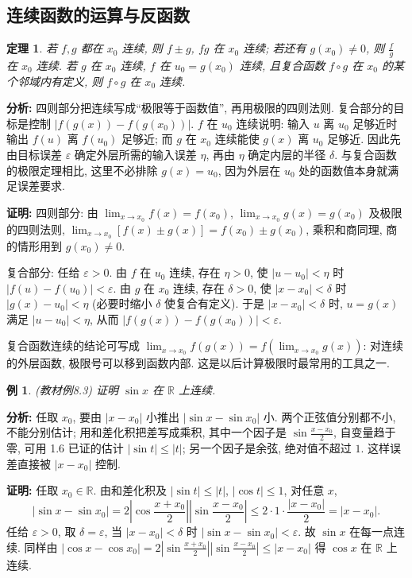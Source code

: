 \documentclass[UTF8,openany]{ctexbook}
\theoremstyle{chinesetextbook}
\newtheorem{example}{例}[section]
\newtheorem{theorem}{定理}[section]
\newenvironment{cnproof}{\par\indent\textbf{证明:} \ignorespaces}{\par}
\begin{document}
\subsection{连续函数的运算与反函数}
\begin{theorem}
若 $f,g$ 都在 $x_0$ 连续, 则 $f\pm g$, $fg$ 在 $x_0$ 连续; 若还有 $g(x_0)\ne0$, 则 $\displaystyle\frac fg$ 在 $x_0$ 连续. 若 $g$ 在 $x_0$ 连续, $f$ 在 $u_0=g(x_0)$ 连续, 且复合函数 $f\circ g$ 在 $x_0$ 的某个邻域内有定义, 则 $f\circ g$ 在 $x_0$ 连续.
\end{theorem}
\par\indent\textbf{分析:} 四则部分把连续写成“极限等于函数值”, 再用极限的四则法则. 复合部分的目标是控制 $|f(g(x))-f(g(x_0))|$. $f$ 在 $u_0$ 连续说明: 输入 $u$ 离 $u_0$ 足够近时输出 $f(u)$ 离 $f(u_0)$ 足够近; 而 $g$ 在 $x_0$ 连续能使 $g(x)$ 离 $u_0$ 足够近. 因此先由目标误差 $\varepsilon$ 确定外层所需的输入误差 $\eta$, 再由 $\eta$ 确定内层的半径 $\delta$. 与复合函数的极限定理相比, 这里不必排除 $g(x)=u_0$, 因为外层在 $u_0$ 处的函数值本身就满足误差要求.
\begin{cnproof}
四则部分: 由 $\displaystyle\lim_{x\to x_0}f(x)=f(x_0)$, $\displaystyle\lim_{x\to x_0}g(x)=g(x_0)$ 及极限的四则法则, $\displaystyle\lim_{x\to x_0}[f(x)\pm g(x)]=f(x_0)\pm g(x_0)$, 乘积和商同理, 商的情形用到 $g(x_0)\ne0$.

复合部分: 任给 $\varepsilon>0$. 由 $f$ 在 $u_0$ 连续, 存在 $\eta>0$, 使 $|u-u_0|<\eta$ 时 $|f(u)-f(u_0)|<\varepsilon$. 由 $g$ 在 $x_0$ 连续, 存在 $\delta>0$, 使 $|x-x_0|<\delta$ 时 $|g(x)-u_0|<\eta$ (必要时缩小 $\delta$ 使复合有定义). 于是 $|x-x_0|<\delta$ 时, $u=g(x)$ 满足 $|u-u_0|<\eta$, 从而 $|f(g(x))-f(g(x_0))|<\varepsilon$.
\end{cnproof}
复合函数连续的结论可写成 $\displaystyle\lim_{x\to x_0}f(g(x))=f\left(\lim_{x\to x_0}g(x)\right)$: 对连续的外层函数, 极限号可以移到函数内部. 这是以后计算极限时最常用的工具之一.
\begin{example}
\textnormal{(教材例8.3)} 证明 $\sin x$ 在 $\mathbb R$ 上连续.
\end{example}
\par\indent\textbf{分析:} 任取 $x_0$, 要由 $|x-x_0|$ 小推出 $|\sin x-\sin x_0|$ 小. 两个正弦值分别都不小, 不能分别估计; 用和差化积把差写成乘积, 其中一个因子是 $\displaystyle\sin\frac{x-x_0}2$, 自变量趋于零, 可用 1.6 已证的估计 $|\sin t|\le|t|$; 另一个因子是余弦, 绝对值不超过 $1$. 这样误差直接被 $|x-x_0|$ 控制.
\begin{cnproof}
任取 $x_0\in\mathbb R$. 由和差化积及 $|\sin t|\le|t|$, $|\cos t|\le1$, 对任意 $x$,
\[
|\sin x-\sin x_0|
=2\left|\cos\frac{x+x_0}2\right|\left|\sin\frac{x-x_0}2\right|
\le2\cdot1\cdot\frac{|x-x_0|}2=|x-x_0|.
\]
任给 $\varepsilon>0$, 取 $\delta=\varepsilon$, 当 $|x-x_0|<\delta$ 时 $|\sin x-\sin x_0|<\varepsilon$. 故 $\sin x$ 在每一点连续. 同样由 $\displaystyle|\cos x-\cos x_0|=2\left|\sin\frac{x+x_0}2\right|\left|\sin\frac{x-x_0}2\right|\le|x-x_0|$ 得 $\cos x$ 在 $\mathbb R$ 上连续.
\end{cnproof}
\end{document}

